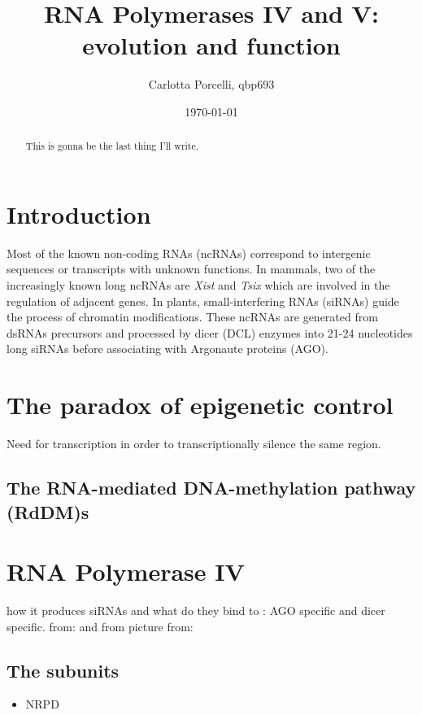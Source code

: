 \documentclass[a4paper, twocolumn]{article}
\title{RNA Polymerases IV and V: evolution and function}
\author{Carlotta Porcelli, qbp693}
\date{\today}
\begin{document}
\maketitle

\begin{abstract}
This is gonna be the last thing I'll write.

\end{abstract}

\section{Introduction}
Most of the known non-coding RNAs (ncRNAs) correspond to intergenic sequences or transcripts with unknown functions. In mammals, two of the increasingly known long ncRNAs are \textit{Xist} and \textit{Tsix} which are involved in the regulation of adjacent genes. 
In plants, small-interfering RNAs (siRNAs) guide the process of chromatin modifications. These ncRNAs are generated from dsRNAs precursors and processed by dicer (DCL) enzymes into 21-24 nucleotides long siRNAs before associating with Argonaute proteins (AGO). 

\section{The paradox of epigenetic control}
Need for transcription in order to transcriptionally silence the same region. \cite{paradox}

\subsection{The RNA-mediated DNA-methylation pathway (RdDM)s}


\section{RNA Polymerase IV}
how it produces siRNAs and what do they bind to : AGO specific and dicer specific. 
from:  \cite{Zhang130} and from \cite{ONODERA2005}
picture from: \cite{Xu2013}

\subsection{The subunits}

\begin{itemize}
	\item NRPD

\end{itemize}
\end{document}
